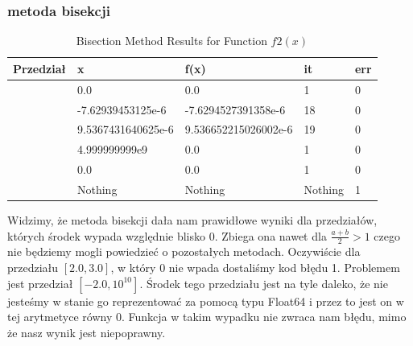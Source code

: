 \documentclass{article}
\begin{document}
\subsubsection*{metoda bisekcji}
\begin{table}[h]
  \centering
  \begin{tabular}{|l|l|l|l|l|}
  \hline
  \textbf{Przedział}                           & \textbf{x}                    & \textbf{f(x)}                   & \textbf{it} & \textbf{err} \\ \hline
  [-1.0, 1.0]                                 & 0.0                           & 0.0                             & 1           & 0            \\ \hline
  [-5.0, 1.0]                                 & -7.62939453125e-6             & -7.6294527391358e-6             & 18            & 0            \\ \hline
  [-5.0, 10.0]                                & 9.5367431640625e-6            & 9.536652215026002e-6            & 19            & 0          \\ \hline 
  [-2.0, $10^{10}$]                           & 4.999999999e9                 & 0.0                             & 1           & 0            \\ \hline
  [$-11^{10}$, $11^{10}$]                     & 0.0                           & 0.0                             & 1           & 0            \\ \hline
  [2.0, 3.0]                                  & Nothing                       & Nothing                         & Nothing     & 1            \\ \hline
  \end{tabular}
  \caption{Bisection Method Results for Function \( f2(x) \)}
  \label{tab:bisection_f2}
\end{table}
Widzimy, że metoda bisekcji dała nam prawidłowe wyniki dla
przedziałów, których środek wypada względnie blisko 0. Zbiega ona nawet
dla $\frac{a + b}{2} > 1$ czego nie będziemy mogli powiedzieć
o pozostałych metodach. Oczywiście
dla przedziału $[2.0, 3.0]$, w który 0 nie wpada dostaliśmy kod błędu
1. Problemem jest przedział $[-2.0, 10^{10}]$. Środek tego przedziału
jest na tyle daleko, że nie jesteśmy w stanie go reprezentować za pomocą
typu Float64 i przez to jest on w tej arytmetyce równy 0. Funkcja w takim
wypadku nie zwraca nam błędu, mimo że nasz wynik jest niepoprawny.
\end{document}

